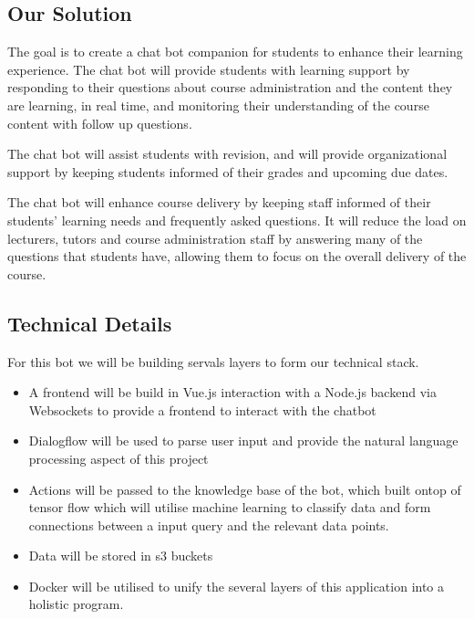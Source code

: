 \documentclass{article}
\begin{document}
\subsection{Our Solution}

The goal is to create a chat bot companion for students to enhance their learning experience. The chat bot will provide students with learning support by responding to their questions about course administration and the content they are learning, in real time, and monitoring their understanding of the course content with follow up questions.

The chat bot will assist students with revision, and will provide organizational support by keeping students informed of their grades and upcoming due dates.

The chat bot will enhance course delivery by keeping staff informed of their students' learning needs and frequently asked questions. It will reduce the load on lecturers, tutors and course administration staff by answering many of the questions that students have, allowing them to focus on the overall delivery of the course. 


\subsection{Technical Details}

For this bot we will be building servals layers to form our technical stack.

\begin{itemize}
  \item A frontend will be build in Vue.js interaction with a Node.js backend via Websockets to provide a frontend to interact with the chatbot
  \item Dialogflow will be used to parse user input and provide the natural language processing aspect of this project
  \item Actions will be passed to the knowledge base of the bot, which built ontop of tensor flow which will utilise machine learning to classify data and form connections between a input query and the relevant data points.
  \item Data will be stored in s3 buckets
  \item Docker will be utilised to unify the several layers of this application into a holistic program. 
\end{itemize}
\end{document}
